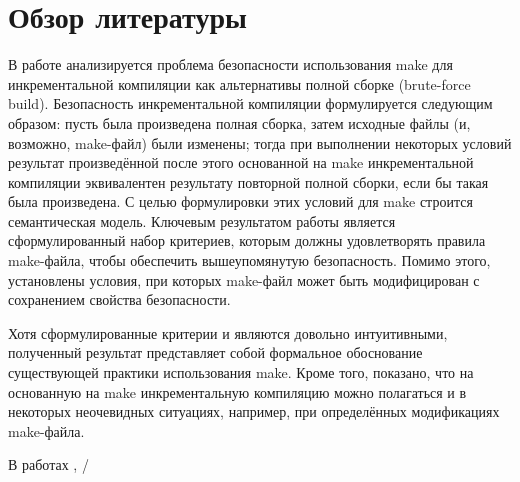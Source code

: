 \section{Обзор литературы}

В работе \cite{safeness_niels} анализируется проблема безопасности использования make для инкрементальной компиляции как альтернативы полной сборке (brute-force build). Безопасность инкрементальной компиляции формулируется следующим образом: пусть была произведена полная сборка, затем исходные файлы (и, возможно, make-файл) были изменены; тогда при выполнении некоторых условий результат произведённой после этого основанной на make инкрементальной компиляции эквивалентен результату повторной полной сборки, если бы такая была произведена. С целью формулировки этих условий для make строится семантическая модель. Ключевым результатом работы является сформулированный набор критериев, которым должны удовлетворять правила make-файла, чтобы обеспечить вышеупомянутую безопасность. Помимо этого, установлены условия, при которых make-файл может быть модифицирован с сохранением свойства безопасности.

Хотя сформулированные критерии и являются довольно интуитивными, полученный результат представляет собой формальное обоснование существующей практики использования make. Кроме того, показано, что на основанную на make инкрементальную компиляцию можно полагаться и в некоторых неочевидных ситуациях, например, при определённых модификациях make-файла.

В работах \cite{amake2012}, \cite{amake2013}/